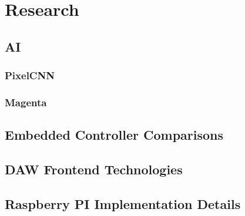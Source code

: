 \section{Research}

\subsection{AI}

\blindtext

\subsubsection{PixelCNN}

\blindtext

\subsubsection{Magenta}

\blindtext

\subsection{Embedded Controller Comparisons}

\blindtext

\subsection{DAW Frontend Technologies}

\blindtext

\subsection{Raspberry PI Implementation Details}

\blindtext

